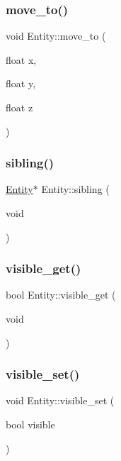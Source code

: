 \mbox{\label{classEntity_ad5ac30e3a84dc75899558268dfe302ac}} 
\subsubsection{\texorpdfstring{move\+\_\+to()}{move\_to()}}
{\footnotesize\ttfamily void Entity\+::move\+\_\+to (\begin{DoxyParamCaption}\item[{float}]{x,  }\item[{float}]{y,  }\item[{float}]{z }\end{DoxyParamCaption})}

\mbox{\label{classEntity_adc18417a592fccbac61f000eb9ec88fe}} 
\subsubsection{\texorpdfstring{sibling()}{sibling()}}
{\footnotesize\ttfamily \mbox{\hyperlink{classEntity}{Entity}}$\ast$ Entity\+::sibling (\begin{DoxyParamCaption}\item[{void}]{ }\end{DoxyParamCaption})}

\mbox{\label{classEntity_aab8f9cda6abb84ee7f9528d2e74554eb}} 
\subsubsection{\texorpdfstring{visible\+\_\+get()}{visible\_get()}}
{\footnotesize\ttfamily bool Entity\+::visible\+\_\+get (\begin{DoxyParamCaption}\item[{void}]{ }\end{DoxyParamCaption})}

\mbox{\label{classEntity_a4ef03d07f6077a104589568aafb068ee}} 
\subsubsection{\texorpdfstring{visible\+\_\+set()}{visible\_set()}}
{\footnotesize\ttfamily void Entity\+::visible\+\_\+set (\begin{DoxyParamCaption}\item[{bool}]{visible }\end{DoxyParamCaption})}

